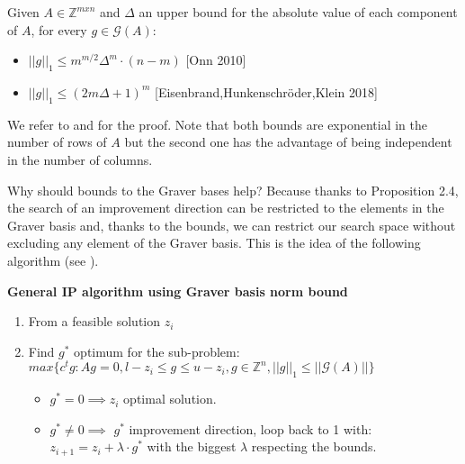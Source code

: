 \begin{proposition}
Given $A \in \mathbb{Z}^{mxn}$ and $\Delta$ an upper bound for the absolute value of each component of $A$, for every $g \in \mathcal{G}(A)$:
\vspace{-10pt}
\begin{itemize}
    \item $||g||_1 \leq m^{m/2}\Delta^m\cdot(n - m)$ \hspace{10pt}[Onn 2010]
    \item $||g||_1 \leq (2m \Delta + 1)^m$ \hspace{41pt}[Eisenbrand,Hunkenschröder,Klein 2018]
\end{itemize}
\end{proposition}

We refer to \cite{ONN:2010} and \cite{EISENBRAND:2018} for the proof. Note that both bounds are exponential in the number of rows of $A$ but the second one has the advantage of being independent in the number of columns. 

Why should bounds to the Graver bases help? Because thanks to Proposition 2.4, the search of an improvement direction can be restricted to the elements in the Graver basis and, thanks to the bounds, we can restrict our search space without excluding any element of the Graver basis. This is the idea of the following algorithm (see \cite{HEMMECKE:2013}).


\textbf{General IP algorithm using Graver basis norm bound}
\vspace{-8pt}
\begin{enumerate}
    \item From a feasible solution $z_i$
    \item Find $g^*$ optimum for the sub-problem: \vspace{4pt}\\
          $max\{c^tg : Ag = 0, l-z_i \leq g \leq u-z_i, g \in \mathbb{Z}^n, ||g||_1 \leq ||\mathcal{G}(A)|| \}$ \vspace{4pt}
    \begin{itemize}
        \item $g^* = 0 \implies z_i$ optimal solution.
        \item $g^* \neq 0 \implies$ $g^*$ improvement direction, loop back to 1 with:\\
        $z_{i+1} = z_i + \lambda \cdot g^*$ with the biggest $\lambda$ respecting the bounds.
    \end{itemize}
\end{enumerate}

